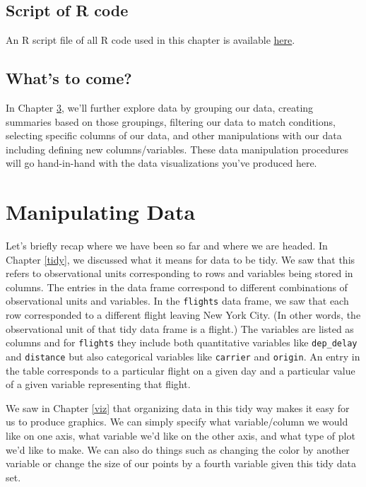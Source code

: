 \documentclass[]{tufte-book}
\begin{document}
\section{Script of R code}\label{script-of-r-code}

An R script file of all R code used in this chapter is available
\href{http://ismayc.github.io/moderndiver-book/04-visualizing_data.R}{here}.

\section{What's to come?}\label{whats-to-come-1}

In Chapter \ref{manip}, we'll further explore data by grouping our data,
creating summaries based on those groupings, filtering our data to match
conditions, selecting specific columns of our data, and other
manipulations with our data including defining new columns/variables.
These data manipulation procedures will go hand-in-hand with the data
visualizations you've produced here.

\chapter{Manipulating Data}\label{manip}

Let's briefly recap where we have been so far and where we are headed.
In Chapter \ref{tidy}, we discussed what it means for data to be tidy.
We saw that this refers to observational units corresponding to rows and
variables being stored in columns. The entries in the data frame
correspond to different combinations of observational units and
variables. In the \texttt{flights} data frame, we saw that each row
corresponded to a different flight leaving New York City. (In other
words, the observational unit of that tidy data frame is a flight.) The
variables are listed as columns and for \texttt{flights} they include
both quantitative variables like \texttt{dep\_delay} and
\texttt{distance} but also categorical variables like \texttt{carrier}
and \texttt{origin}. An entry in the table corresponds to a particular
flight on a given day and a particular value of a given variable
representing that flight.

We saw in Chapter \ref{viz} that organizing data in this tidy way makes
it easy for us to produce graphics. We can simply specify what
variable/column we would like on one axis, what variable we'd like on
the other axis, and what type of plot we'd like to make. We can also do
things such as changing the color by another variable or change the size
of our points by a fourth variable given this tidy data set.
\end{document}
